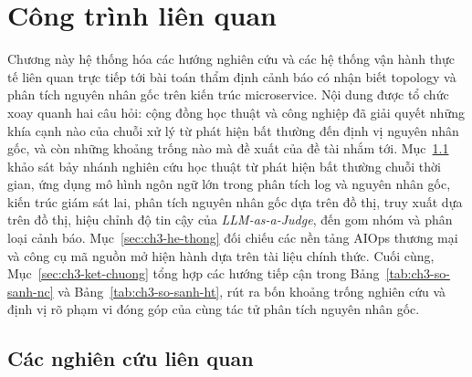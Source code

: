 %        
%        
%        
%        
%

\section{Công trình liên quan}
\label{ch:cong-trinh-lien-quan}

Chương này hệ thống hóa các hướng nghiên cứu và các hệ thống vận hành thực tế liên quan trực tiếp tới bài toán thẩm định cảnh báo có nhận biết topology và phân tích nguyên nhân gốc trên kiến trúc microservice. Nội dung được tổ chức xoay quanh hai câu hỏi: cộng đồng học thuật và công nghiệp đã giải quyết những khía cạnh nào của chuỗi xử lý từ phát hiện bất thường đến định vị nguyên nhân gốc, và còn những khoảng trống nào mà đề xuất của đề tài nhắm tới. Mục~\ref{sec:ch3-nghien-cuu} khảo sát bảy nhánh nghiên cứu học thuật từ phát hiện bất thường chuỗi thời gian, ứng dụng mô hình ngôn ngữ lớn trong phân tích log và nguyên nhân gốc, kiến trúc giám sát lai, phân tích nguyên nhân gốc dựa trên đồ thị, truy xuất dựa trên đồ thị, hiệu chỉnh độ tin cậy của \emph{LLM-as-a-Judge}, đến gom nhóm và phân loại cảnh báo. Mục~\ref{sec:ch3-he-thong} đối chiếu các nền tảng AIOps thương mại và công cụ mã nguồn mở hiện hành dựa trên tài liệu chính thức. Cuối cùng, Mục~\ref{sec:ch3-ket-chuong} tổng hợp các hướng tiếp cận trong Bảng~\ref{tab:ch3-so-sanh-nc} và Bảng~\ref{tab:ch3-so-sanh-ht}, rút ra bốn khoảng trống nghiên cứu và định vị rõ phạm vi đóng góp của \CTAV{} cùng tác tử phân tích nguyên nhân gốc.

\subsection{Các nghiên cứu liên quan}
\label{sec:ch3-nghien-cuu}

